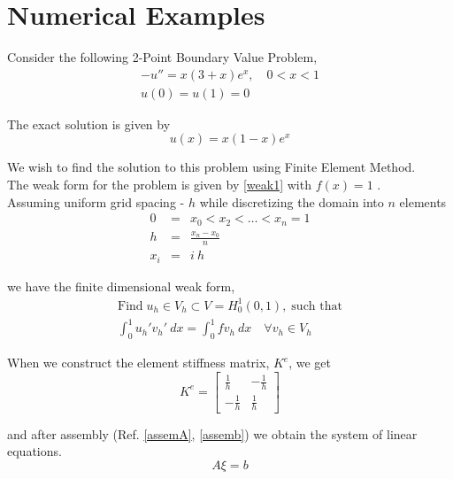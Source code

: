 \section{Numerical Examples}
\begin{example}
	Consider the following 2-Point Boundary Value Problem,
	\begin{eqnarray}
		-u'' = x(3+x)e^x, \quad 0<x<1\\
		u(0) = u(1) = 0
	\end{eqnarray}
	
		The exact solution is given by
		\begin{equation}
			u(x) = x(1-x)e^x
		\end{equation}
		
		We wish to find the solution to this problem using Finite Element Method.\\
		
		The weak form for the problem is given by \ref{weak1} with $f(x) = 1$ .\\
		
		 Assuming uniform grid spacing - $h$ while discretizing the domain into $n$ elements
		 \begin{eqnarray}
		 	 0&=&x_0 < x_2 < \dots < x_n = 1 \\
		 	 h &=& \frac{x_n - x_0}{n}\\
		 	 x_i &=& i \ h
		 \end{eqnarray}
		 
		  we have the finite dimensional weak form,
		 \begin{eqnarray}
		 	\text{Find} \; u_h \in V_h \subset V = H^1_0(0,1), \; \text{such that} \\
		 	\int_{0}^{1} u_h' v_h' \ dx = \int_{0}^{1} f v_h \ dx \quad \forall v_h \in V_h 	 	 
		 \end{eqnarray}	
		 
		 When we construct the element stiffness matrix, $K^e$, we get 
		 \begin{equation}
		 	K^e = \begin{bmatrix}
		 	\frac{1}{h} & -\frac{1}{h} \\
		 	-\frac{1}{h} & \frac{1}{h} 
		 	\end{bmatrix}
		 \end{equation}
		 
		 and after assembly (Ref. \ref{assemA}, \ref{assemb}) we obtain the system of linear equations.
		 \begin{equation}
		 	A \xi = b
		 \end{equation}
		 

\end{example}
